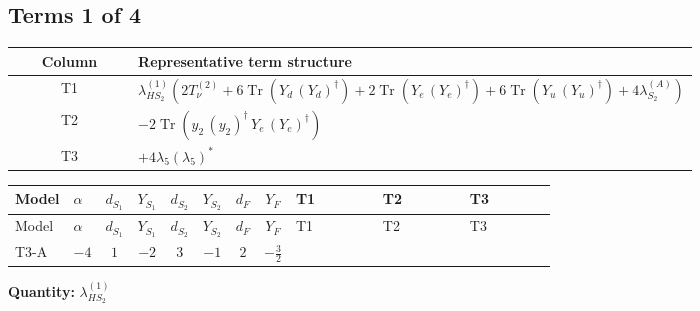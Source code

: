 \documentclass[8pt]{article}
\begin{document}
\begin{landscape}
\subsection*{Terms 1 of 4}
\begin{center}
\begin{tabular}{@{}c >{\raggedright\arraybackslash}p{0.82\linewidth}@{}}
\toprule
Column & Representative term structure \\
\midrule
T1 & \(\displaystyle {\lambda_{HS_2}^{(1)}} (2 T_{\nu}^{(2)}+6 \operatorname{Tr}\!\left({Y_d}\,\left({Y_d}\right)^{\dagger}\right)+2 \operatorname{Tr}\!\left({Y_e}\,\left({Y_e}\right)^{\dagger}\right)+6 \operatorname{Tr}\!\left({Y_u}\,\left({Y_u}\right)^{\dagger}\right)+4 {\lambda_{S_2}^{(A)}})\) \\
\midrule
T2 & \(\displaystyle -2 \operatorname{Tr}\!\left({y_2}\,\left({y_2}\right)^{\dagger}\,{Y_e}\,\left({Y_e}\right)^{\dagger}\right)\) \\
\midrule
T3 & \(\displaystyle +4 {\lambda_5} \left({\lambda_5}\right)^{*}\) \\
\midrule
\bottomrule
\end{tabular}
\end{center}
\smallskip
\tiny
\begin{longtable}{@{}llcccccc >{\raggedright\arraybackslash}p{0.21\linewidth} >{\raggedright\arraybackslash}p{0.21\linewidth} >{\raggedright\arraybackslash}p{0.21\linewidth}@{}}
\toprule
Model & $\alpha$ & $d_{S_1}$ & $Y_{S_1}$ & $d_{S_2}$ & $Y_{S_2}$ & $d_F$ & $Y_F$ & T1 & T2 & T3 \\
\midrule
\endfirsthead
\toprule
Model & $\alpha$ & $d_{S_1}$ & $Y_{S_1}$ & $d_{S_2}$ & $Y_{S_2}$ & $d_F$ & $Y_F$ & T1 & T2 & T3 \\
\midrule
\endhead
T3-A & $-4$ & $1$ & $-2$ & $3$ & $-1$ & $2$ & $-\frac{3}{2}$ & \scriptsize\adjustbox{max width=\linewidth}{$\begin{gathered} {\lambda_{HS_2}^{(1)}} (2 T_{\nu}^{(2)}+6 \operatorname{Tr}\!\left({Y_d}\,\left({Y_d}\right)^{\dagger}\right)+2 \operatorname{Tr}\!\left({Y_e}\,\left({Y_e}\right)^{\dagger}\right)+6 \operatorname{Tr}\!\left({Y_u}\,\left({Y_u}\right)^{\dagger}\right)+4 {\lambda_{S_2}^{(A)}})\end{gathered}$} & \scriptsize\adjustbox{max width=\linewidth}{$\begin{gathered} -2 \operatorname{Tr}\!\left({y_2}\,\left({y_2}\right)^{\dagger}\,{Y_e}\,\left({Y_e}\right)^{\dagger}\right)\end{gathered}$} & \scriptsize\adjustbox{max width=\linewidth}{$\begin{gathered} +4 {\lambda_5} \left({\lambda_5}\right)^{*}\end{gathered}$} \\
\midrule
\bottomrule
\end{longtable}
\clearpage
\noindent\textbf{Quantity: }$\lambda_{HS_2}^{(1)}$\par\smallskip

\end{landscape}
\end{document}
